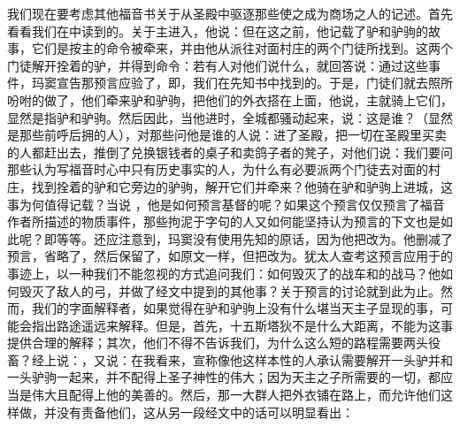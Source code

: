 我们现在要考虑其他福音书关于从圣殿中驱逐那些使之成为商场之人的记述。首先看看我们在中读到的。关于主进入，他说：但在这之前，他记载了驴和驴驹的故事，它们是按主的命令被牵来，并由他从派往对面村庄的两个门徒所找到。这两个门徒解开拴着的驴，并得到命令：若有人对他们说什么，就回答说：通过这些事件，玛窦宣告那预言应验了，即，我们在先知书中找到的。于是，门徒们就去照所吩咐的做了，他们牵来驴和驴驹，把他们的外衣搭在上面，他说，主就骑上它们，显然是指驴和驴驹。然后因此，当他进时，全城都骚动起来，说：这是谁？（显然是那些前呼后拥的人），对那些问他是谁的人说：进了圣殿，把一切在圣殿里买卖的人都赶出去，推倒了兑换银钱者的桌子和卖鸽子者的凳子，对他们说：我们要问那些认为写福音时心中只有历史事实的人，为什么有必要派两个门徒去对面的村庄，找到拴着的驴和它旁边的驴驹，解开它们并牵来？他骑在驴和驴驹上进城，这事为何值得记载？当说 ，他是如何预言基督的呢？如果这个预言仅仅预言了福音作者所描述的物质事件，那些拘泥于字句的人又如何能坚持认为预言的下文也是如此呢？即等等。还应注意到，玛窦没有使用先知的原话，因为他把改为。他删减了预言，省略了，然后保留了，如原文一样，但把改为。犹太人查考这预言应用于的事迹上，以一种我们不能忽视的方式追问我们：如何毁灭了的战车和的战马？他如何毁灭了敌人的弓，并做了经文中提到的其他事？关于预言的讨论就到此为止。然而，我们的字面解释者，如果觉得在驴和驴驹上没有什么堪当天主子显现的事，可能会指出路途遥远来解释。但是，首先，十五斯塔狄不是什么大距离，不能为这事提供合理的解释；其次，他们不得不告诉我们，为什么这么短的路程需要两头役畜？经上说：，又说：在我看来，宣称像他这样本性的人承认需要解开一头驴并和一头驴驹一起来，并不配得上圣子神性的伟大；因为天主之子所需要的一切，都应当是伟大且配得上他的美善的。然后，那一大群人把外衣铺在路上，而允许他们这样做，并没有责备他们，这从另一段经文中的话可以明显看出： 